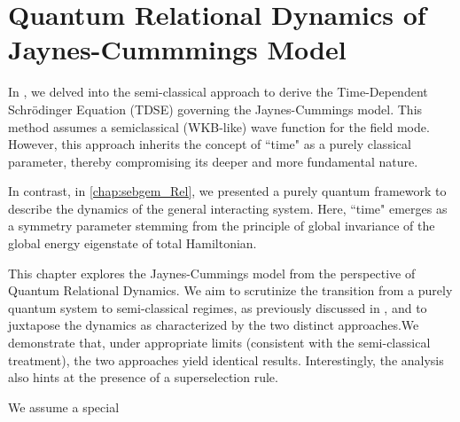 \chapter{Quantum Relational Dynamics of Jaynes-Cummmings Model
\label{chap5:RDQ_JCM_chap}}

In , we delved into the semi-classical approach to derive the Time-Dependent Schrödinger Equation (TDSE) governing the Jaynes-Cummings model. 
This method assumes a semiclassical (WKB-like) wave function for the field mode. However, 
this approach inherits the concept of ``time" as a purely classical parameter, thereby compromising its deeper and more fundamental nature.

In contrast, in \ref{chap:sebgem_Rel}, we presented a purely quantum framework to describe the dynamics of the general interacting system. Here, ``time" 
emerges as a symmetry parameter stemming from the principle of global invariance of the global energy 
eigenstate of total Hamiltonian.

This chapter explores the Jaynes-Cummings model from the perspective of Quantum Relational Dynamics. 
We aim to scrutinize the transition from a purely quantum system to semi-classical regimes, 
as previously discussed in , and to juxtapose the dynamics as 
characterized by the two distinct approaches.We demonstrate that, under appropriate limits
(consistent with the semi-classical treatment), the two approaches yield identical results. 
Interestingly, the analysis also hints at the presence of a superselection rule.

We assume a special